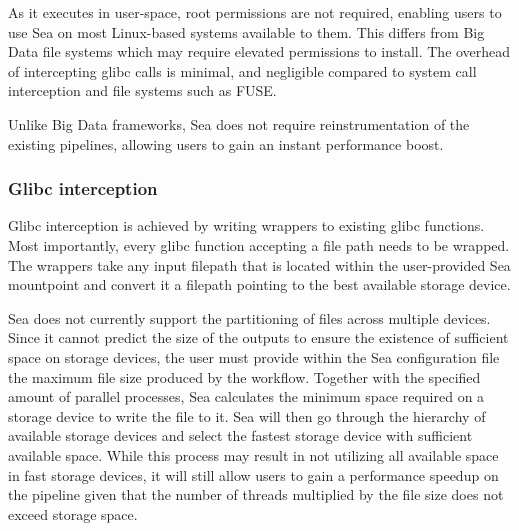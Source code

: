 As it executes in user-space, root permissions are not required, enabling users
to use Sea on most Linux-based systems available to them. This differs from Big
Data file systems which may require elevated permissions to install. The
overhead of intercepting glibc calls is minimal, and negligible compared to
system call interception and file systems such as FUSE.

Unlike Big Data frameworks, Sea does not require reinstrumentation of the
existing pipelines, allowing users to gain an instant performance boost.

\subsubsection{Glibc interception}

Glibc interception is achieved by writing wrappers to existing glibc functions.
Most importantly, every glibc function accepting a file path needs to be
wrapped. The wrappers take any input filepath that is located within the
user-provided Sea mountpoint and convert it a filepath pointing to the best
available storage device.

Sea does not currently support the partitioning of files across multiple
devices. Since it cannot predict the size of the outputs to ensure the existence
of sufficient space on storage devices, the user must provide within the Sea
configuration file the maximum file size produced by the workflow. Together with
the specified amount of parallel processes, Sea calculates the minimum space
required on a storage device to write the file to it.
Sea will then go through the hierarchy of available storage devices and select
the fastest storage device with sufficient available space. While this process
may result in not utilizing all available space in fast storage devices, it will
still allow users to gain a performance speedup on the pipeline given that the
number of threads multiplied by the file size does not exceed storage space.


